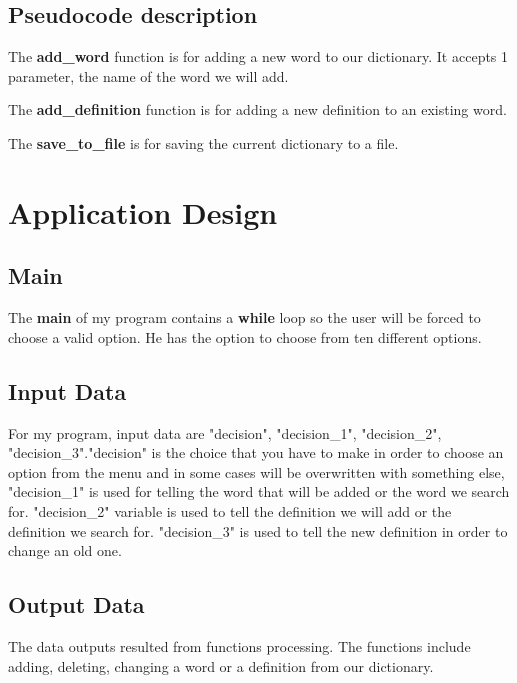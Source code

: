 \documentclass{article}
\begin{document}
\begin{center}
\begin{tabbing}

\end{tabbing}
\end{center}



\subsection{Pseudocode description}
\textbf{}
\indent The {\bf add\_word} function is for adding a new word to our dictionary. It accepts 1 parameter, the name of the word we will add. 

\indent The {\bf add\_definition} function is for adding a new definition to an existing word. 

\indent The {\bf save\_to\_file} is for saving the current dictionary to a file.


\section{Application Design}
\subsection{Main}
\textbf{}
\indent The {\bf main} of my program contains a {\bf while} loop so the user will be forced to choose a valid option. He has the option to choose from ten different options.


\subsection{Input Data}
\textbf{}
\indent For my program, input data are "decision", "decision\_1", "decision\_2", "decision\_3"."decision" is the choice that you have to make in order to choose an option from the menu and in some cases will be overwritten with something else, "decision\_1" is used for telling the word that will be added or the word we search for. "decision\_2" variable is used to tell the definition we will add or the definition we search for. "decision\_3" is used to tell the new definition in order to change an old one.

\subsection{Output Data}
\textbf{}
\indent The data outputs resulted from functions processing. The functions include adding, deleting, changing a word or a definition from our dictionary.
\end{document}
